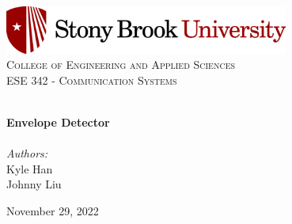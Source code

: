 
\begin{titlepage}
\vbox{ }
\vbox{ }
\begin{center}
\includegraphics[width=0.70\textwidth]{Images/stony-brook-university-logo-horizontal-300-1024x173.png}\\[1cm]
\textsc{\LARGE College of Engineering and Applied Sciences}\\[1.5cm]
\textsc{\Large ESE 342 - Communication Systems}\\[0.5cm]
\vbox{ }

\HRule \\[0.4cm]
{ \huge \bfseries Envelope Detector}\\[0.4cm]
\HRule \\[1.5cm]

\large
\emph{Authors:}\\
Kyle Han \\
Johnny Liu
\vfill

{\large November 29, 2022}
\end{center}
\end{titlepage}